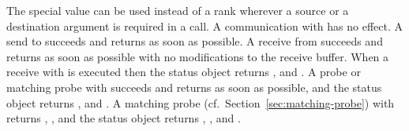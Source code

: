 The special value  can be used
instead of a rank wherever a
source or a destination argument is required in a call.  A communication
with  has no effect.
A send to 
succeeds and returns as soon as possible.
A receive from  succeeds and
returns as soon as possible with no modifications to the receive buffer.
When a receive with \mpicode{ = } is executed then
the status object returns \mpicode{ = },
\mpicode{ = } and
.
A probe or matching probe with \mpicode{ = } succeeds and
returns as soon as possible, and the status object returns
\mpicode{ = },
\mpicode{ = } and
.
A matching probe (cf.~Section~\ref{sec:matching-probe}) with
\mpicode{ = } returns \mpicode{ = },
\mpicode{ = }, and the status object returns
\mpicode{ = }, \mpicode{ = }, and
.
